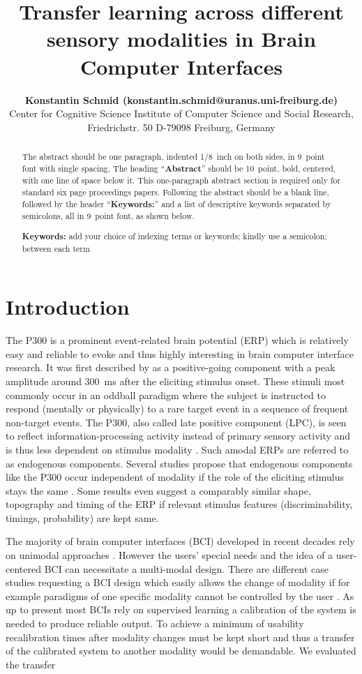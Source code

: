 \documentclass[10pt,letterpaper]{article}
\title{Transfer learning across different sensory modalities in Brain Computer Interfaces}
\author{{\large \bf Konstantin Schmid (konstantin.schmid@uranus.uni-freiburg.de)} \\
	  Center for Cognitive Science Institute of Computer Science and Social Research,\\
	  Friedrichstr. 50 D-79098 Freiburg, Germany\\}
\begin{document}
\maketitle


\begin{abstract}
The abstract should be one paragraph, indented 1/8~inch on both sides,
in 9~point font with single spacing. The heading ``{\bf Abstract}''
should be 10~point, bold, centered, with one line of space below
it. This one-paragraph abstract section is required only for standard
six page proceedings papers. Following the abstract should be a blank
line, followed by the header ``{\bf Keywords:}'' and a list of
descriptive keywords separated by semicolons, all in 9~point font, as
shown below.

\textbf{Keywords:} 
add your choice of indexing terms or keywords; kindly use a
semicolon; between each term
\end{abstract}

\section{Introduction}
The P300 is a prominent event-related brain potential (ERP) which is relatively easy and reliable to evoke and thus highly interesting in brain computer interface research.
It was first described by  as a positive-going component with a peak amplitude around 300~ms after the eliciting stimulus onset.
These stimuli most commonly occur in an oddball paradigm where the subject is instructed to respond (mentally or physically) to a rare target event in a sequence of frequent non-target events.
The P300, also called late positive component (LPC), is seen to reflect information-processing activity instead of primary sensory activity and is thus less dependent on stimulus modality \cite{Wolpaw_2012}.
Such amodal ERPs are referred to as endogenous components.
Several studies propose that endogenous components like the P300 occur independent of modality if the role of the eliciting stimulus stays the same \cite{Chang_2013,Ji_1999,Sangal_1996,Polich_2007}.
Some results even suggest a comparably similar shape, topography and timing of the ERP if relevant stimulus features (discriminability, timings, probability) are kept same.

The majority of brain computer interfaces (BCI) developed in recent decades rely on unimodal approaches \cite{Wolpaw_2012}.
However the users' special needs and the idea of a user-centered BCI can necessitate a multi-modal design.
There are different case studies requesting a BCI design which easily allows the change of modality if for example paradigms of one specific modality cannot be controlled by the user \cite{Schreuder_2013, Kaufmann_2013}.
As up to present most BCIs rely on supervised learning \cite{Wolpaw_2012} a calibration of the system is needed to produce reliable output.
To achieve a minimum of usability recalibration times after modality changes must be kept short and thus a transfer of the calibrated system to another modality would be demandable. 
We evaluated the transfer 
\end{document}
